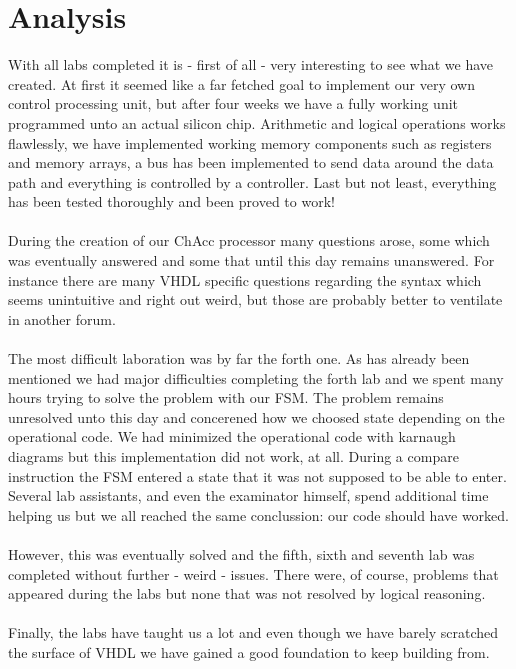\documentclass[a4paper,11pt]{article}
\begin{document}
\section{Analysis}
With all labs completed it is - first of all - very interesting to see what 
we have created. At first it seemed like a far fetched goal to implement our 
very own control processing unit, but after four weeks we have a fully 
working unit programmed unto an actual silicon chip. Arithmetic and logical 
operations works flawlessly, we have implemented working memory components 
such as registers and memory arrays, a bus has been implemented to send data 
around the data path and everything is controlled by a controller. Last but 
not least, everything has been tested thoroughly and been proved to work!\\\\
\noindent
During the creation of our ChAcc processor many questions arose, some which 
was eventually answered and some that until this day remains unanswered. For 
instance there are many VHDL specific questions regarding the syntax which 
seems unintuitive and right out weird, but those are probably better to 
ventilate in another forum.\\\\
\noindent
The most difficult laboration was by far the forth one. As has already been 
mentioned we had major difficulties completing the forth lab and we spent 
many hours trying to solve the problem with our FSM. The problem remains 
unresolved unto this day and concerened how we choosed state depending on the 
operational code. We had minimized the operational code with karnaugh diagrams 
but this implementation did not work, at all. During a compare instruction 
the FSM entered a state that it was not supposed to be able to enter. Several 
lab assistants, and even the examinator himself, spend additional time helping 
us but we all reached the same conclussion: our code should have worked.\\\\
\noindent
However, this was eventually solved and the fifth, sixth and seventh lab 
was completed without further - weird - issues. There were, of course, problems 
that appeared during the labs but none that was not resolved by logical 
reasoning.\\\\
\noindent
Finally, the labs have taught us a lot and even though we have barely 
scratched the surface of VHDL we have gained a good foundation to keep 
building from. 
\end{document}
